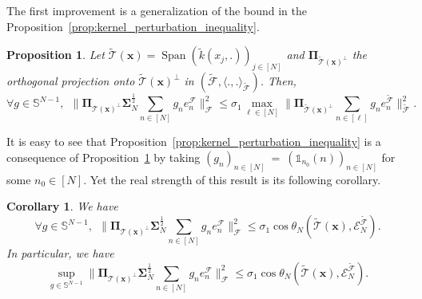 \documentclass[twoside,11pt]{book}
\newtheorem{corollary}{Corollary}
\newtheorem{proposition}{Proposition}
\numberwithin{theorem}{chapter}
\numberwithin{definition}{chapter}
\numberwithin{proposition}{chapter}
\numberwithin{corollary}{chapter}
\numberwithin{example}{chapter}
\numberwithin{lemma}{chapter}
\numberwithin{assumption}{chapter}
\DeclareMathOperator{\Span}{\mathrm{Span}}
\begin{document}
The first improvement is a generalization of the bound in the Proposition~\ref{prop:kernel_perturbation_inequality}. 

\begin{proposition}\label{prop:strong_kernel_perturbation_inequality}
Let $ \tilde{\mathcal{T}}(\bm{x}) = \Span \left( \tilde{k}(x_{j},.) \right)_{j \in [N]}$ and $\bm{\Pi}_{\tilde{\mathcal{T}}(\bm{x})^{\perp}}$ the orthogonal projection onto $\tilde{\mathcal{T}}(\bm{x})^{\perp}$ in $(\tilde{\mathcal{F}}, \langle .,.\rangle_{\tilde{\mathcal{F}}})$. Then,
\begin{equation}\label{eq:kernel_perturbation_inequality_generalization}
    \forall g \in \mathbb{S}^{N-1}, \:\: \|\bm{\Pi}_{\mathcal{T}(\bm{x})^{\perp}} \bm{\Sigma}_{N}^{\frac{1}{2}} \sum\limits_{n \in [N]}g_{n} e_{n}^{\mathcal{F}}\|_{\mathcal{F}}^{2} \leq \sigma_{1} \max\limits_{\ell \in [N]}   \|\bm{\Pi}_{\tilde{\mathcal{T}}(\bm{x})^{\perp}} \sum\limits_{n \in [\ell]}g_{n} e_{n}^{\tilde{\mathcal{F}}}\|_{\tilde{\mathcal{F}}}^{2}.
\end{equation}
\end{proposition}

It is easy to see that Proposition~\ref{prop:kernel_perturbation_inequality} is a consequence of Proposition~\ref{prop:strong_kernel_perturbation_inequality} by taking $(g_{n})_{n \in [N]}~=~(\mathbb{1}_{n_{0}}(n))_{n \in [N]}$ for some $n_{0} \in [N]$. Yet the real strength of this result is its following corollary.

\begin{corollary}
We have 
\begin{equation}\label{eq:kernel_perturbation_inequality_generalization_principal_angles}
    \forall g \in \mathbb{S}^{N-1}, \:\: \|\bm{\Pi}_{\mathcal{T}(\bm{x})^{\perp}} \bm{\Sigma}_{N}^{\frac{1}{2}} \sum\limits_{n \in [N]}g_{n} e_{n}^{\mathcal{F}}\|_{\mathcal{F}}^{2} \leq \sigma_{1} \cos  \theta_{N}(\tilde{\mathcal{T}}(\bm{x}),\mathcal{E}_{N}^{\tilde{\mathcal{F}}}).
\end{equation}
In particular, we have
\begin{equation}\label{eq:kernel_perturbation_inequality_generalization_principal_angles}
     \sup\limits_{g \in \mathbb{S}^{N-1}}\|\bm{\Pi}_{\mathcal{T}(\bm{x})^{\perp}} \bm{\Sigma}_{N}^{\frac{1}{2}} \sum\limits_{n \in [N]}g_{n} e_{n}^{\mathcal{F}}\|_{\mathcal{F}}^{2} \leq \sigma_{1} \cos \theta_{N}(\tilde{\mathcal{T}}(\bm{x}),\mathcal{E}_{N}^{\tilde{\mathcal{F}}}).
\end{equation}

\end{corollary}
\end{document}
